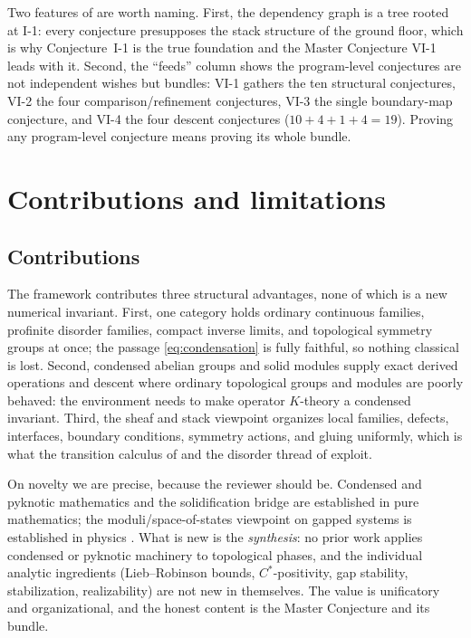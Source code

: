 \documentclass[12pt]{article}
\theoremstyle{plain}
\theoremstyle{definition}
\theoremstyle{remark}
\begin{document}
Two features of  are worth naming. First, the dependency graph is a
tree rooted at I-1: every conjecture presupposes the stack structure of the ground floor,
which is why Conjecture~I-1 is the true foundation and the Master Conjecture VI-1 leads
with it. Second, the ``feeds'' column shows the program-level conjectures are not
independent wishes but bundles: VI-1 gathers the ten structural conjectures, VI-2 the
four comparison/refinement conjectures, VI-3 the single boundary-map conjecture, and VI-4
the four descent conjectures ($10+4+1+4=19$). Proving any program-level conjecture means proving its whole
bundle.

\FloatBarrier
\section{Contributions and limitations}
\label{sec:contributions}

\subsection{Contributions}

The framework contributes three structural advantages, none of which is a new numerical
invariant. First, one category holds ordinary continuous families, profinite disorder
families, compact inverse limits, and topological symmetry groups at once; the passage
\eqref{eq:condensation} is fully faithful, so nothing classical is lost. Second, condensed
abelian groups and solid modules supply exact derived operations and descent where
ordinary topological groups and modules are poorly behaved: the environment
 needs to make operator $K$-theory a condensed invariant. Third, the sheaf
and stack viewpoint organizes local families, defects, interfaces, boundary conditions,
symmetry actions, and gluing uniformly, which is what the transition calculus of
 and the disorder thread of  exploit.

On novelty we are precise, because the reviewer should be. Condensed and pyknotic
mathematics \cite{clausen-scholze-condensed,barwick-haine-pyknotic} and the solidification
bridge \cite{aoki-solidification} are established in pure mathematics; the
moduli/space-of-states viewpoint on gapped systems is established in physics
\cite{hsin-wang-moduli,beaudry-etal,kubota-omega-spectrum,denittis-states,denittis-rendel-weyl}.
What is new is the \emph{synthesis}: no prior work applies condensed or pyknotic machinery
to topological phases, and the individual analytic ingredients (Lieb--Robinson bounds,
$C^\ast$-positivity, gap stability, stabilization, realizability) are not new in
themselves. The value is unificatory and organizational, and the honest content is the
Master Conjecture and its bundle.
\end{document}
